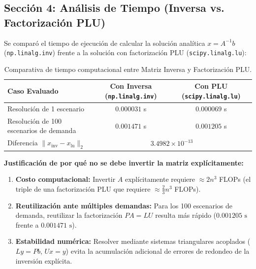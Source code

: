 \documentclass[11pt,a4paper]{article}
\theoremstyle{definition}
\theoremstyle{remark}
\begin{document}
\subsection{Sección 4: Análisis de Tiempo (Inversa vs. Factorización PLU)}
Se comparó el tiempo de ejecución de calcular la solución analítica $x = A^{-1}b$ (\texttt{np.linalg.inv}) frente a la solución con factorización PLU (\texttt{scipy.linalg.lu}):

\begin{table}[h!]
    \centering
    \small
    \caption{Comparativa de tiempo computacional entre Matriz Inversa y Factorización PLU.}
    \label{tab:benchmark_tiempo}
    \begin{tabular}{lcc}
        \toprule
        \textbf{Caso Evaluado} & \textbf{Con Inversa (\texttt{np.linalg.inv})} & \textbf{Con PLU (\texttt{scipy.linalg.lu})} \\
        \midrule
        Resolución de 1 escenario & $0.000031$ s & $0.000069$ s \\
        Resolución de 100 escenarios de demanda & $0.001471$ s & $0.001205$ s \\
        Diferencia $\|x_{\text{inv}} - x_{\text{lu}}\|_2$ & \multicolumn{2}{c}{$3.4982 \times 10^{-13}$} \\
        \bottomrule
    \end{tabular}
\end{table}

\textbf{Justificación de por qué no se debe invertir la matriz explícitamente:}
\begin{enumerate}
    \item \textbf{Costo computacional:} Invertir $A$ explícitamente requiere $\approx 2n^3$ FLOPs (el triple de una factorización PLU que requiere $\approx \frac{2}{3}n^3$ FLOPs).
    \item \textbf{Reutilización ante múltiples demandas:} Para los 100 escenarios de demanda, reutilizar la factorización $PA = LU$ resulta más rápido ($0.001205\text{ s}$ frente a $0.001471\text{ s}$).
    \item \textbf{Estabilidad numérica:} Resolver mediante sistemas triangulares acoplados ($Ly = Pb$, $Ux = y$) evita la acumulación adicional de errores de redondeo de la inversión explícita.
\end{enumerate}

\newpage
\end{document}
